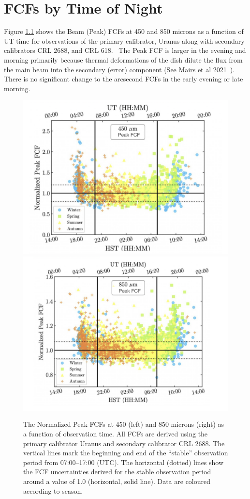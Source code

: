 \chapter{FCFs by Time of Night}
\label{app:fcfstime}

Figure \ref{fig:FCFsTimeOfNight} shows the Beam (Peak) FCFs at 
450 and 850 microns as a function of UT time for observations of the 
primary calibrator, Uranus along with secondary calibrators CRL 2688, and CRL 618.  
The Peak FCF is larger in the evening and morning primarily because thermal 
deformations of the dish dilute the flux from the main beam into the secondary 
(error) component (See Mairs et al 2021~\cite{mairs21}). There is no significant 
change to the arcsecond FCFs in the early evening or late morning.

\begin{figure}
\begin{center}
\includegraphics[width=0.47\linewidth]{sc21-FCFsTimeOfNight-450} \hspace{0.02\linewidth}
\includegraphics[width=0.47\linewidth]{sc21-FCFsTimeOfNight-850}
\caption[FCFs Time of Night]{The Normalized Peak FCFs at 450 (left) and 850 microns (right) 
as a function of observation time. All FCFs are derived using the primary calibrator Uranus and 
secondary calibrator CRL 2688. The vertical lines mark the beginning and end of the “stable” observation 
period from 07:00–17:00 (UTC). The horizontal (dotted) lines show the FCF uncertainties derived for the 
stable observation period around a value of 1.0 (horizontal, solid line). 
Data are coloured according to season. \label{fig:FCFsTimeOfNight}}
\end{center}
\end{figure}


